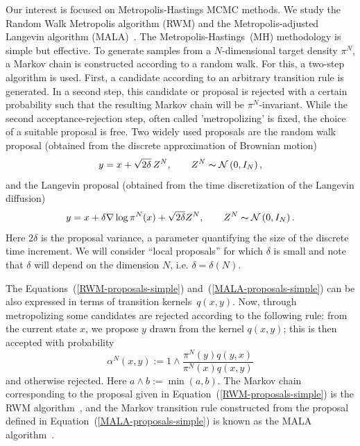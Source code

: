 Our interest is focused on Metropolis-Hastings MCMC methods. We study the Random Walk Metropolis algorithm (RWM) and the Metropolis-adjusted Langevin algorithm (MALA)~\autocite{Liu2004, Robert2005}. The Metropolis-Hastings~(MH) methodology is simple but effective. To generate samples from a $N$-dimensional target density $ \pi^{N} $, a Markov chain  is constructed according to a random walk. For this,  a two-step algorithm is used. First,  a candidate according to an arbitrary transition rule is generated. In a second step, this candidate or proposal is rejected with a certain probability such that the resulting Markov chain will be $\pi^N$-invariant. While the second acceptance-rejection step, often called 'metropolizing' is fixed, the choice of a suitable proposal is free. Two widely used proposals are the random walk proposal (obtained from
the discrete approximation of Brownian motion)
\begin{equation}
\label{RWM-proposals-simple} 
  y = x + \sqrt{2\delta}\,Z^{N}, \qquad Z^{N} \thicksim \mathcal{N}\left( 0,I_N \right),
\end{equation}
and the Langevin proposal (obtained from the time discretization of the
Langevin diffusion)
\begin{equation}
\label{MALA-proposals-simple}
  y = x +  \delta \nabla \log \pi^{N} (x) + \sqrt{2\delta} Z^N, \qquad Z^{N} \thicksim \mathcal{N}\left( 0,I_N \right).
\end{equation}
Here $ 2 \delta $ is the proposal variance, a parameter quantifying the size of the discrete time increment. We will consider “local proposals” for which $ \delta $ is
small and note that $ \delta $ will depend on the dimension $N$, i.e. $\delta  = \delta(N) $. 

The Equations~(\ref{RWM-proposals-simple}) and~(\ref{MALA-proposals-simple}) can be also expressed in terms of transition kernels~$q(x,y)$. Now, through metropolizing some candidates are rejected according to the following rule: from the current state $ x $, we propose $ y $ drawn from the kernel $ q(x, y) $; this is then accepted with probability
\begin{equation}
\label{acceptance probability simple}
 \alpha^{N}(x,y)  := 1 \wedge \dfrac{\pi^{N}(y) q(y,x) }{\pi^{N}(x) q(x,y)}
\end{equation}
and otherwise rejected. Here $ a \wedge b := \min (a,b)$. The Markov chain corresponding to the proposal given in Equation~(\ref{RWM-proposals-simple}) is the RWM algorithm~\autocite{Metropolis1953}, and the Markov transition rule constructed from the proposal defined in Equation~(\ref{MALA-proposals-simple}) is known as the MALA algorithm~\autocite{Robert2005}.

